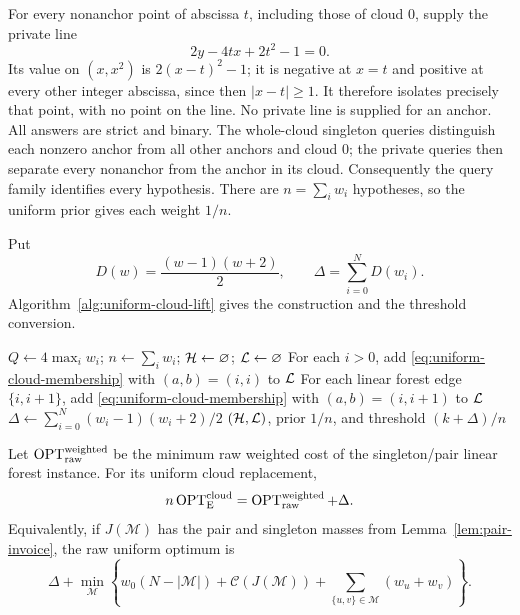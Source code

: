 For every nonanchor point of abscissa $t$, including those of
cloud $0$, supply the private line
\[
 2y-4tx+2t^2-1=0.
\]
Its value on $(x,x^2)$ is $2(x-t)^2-1$; it is negative at $x=t$
and positive at every other integer abscissa, since then $|x-t|\ge1$.
It therefore isolates precisely that point, with no point on the line.
No private line is supplied for an anchor. All answers are strict
and binary. The whole-cloud singleton queries distinguish each
nonzero anchor from all other anchors and cloud $0$; the private
queries then separate every nonanchor from the anchor in its cloud.
Consequently the query family identifies every hypothesis. There are
$n=\sum_iw_i$ hypotheses, so the uniform prior gives each weight $1/n$.

Put
\begin{equation}\label{eq:uniform-cloud-offset}
 D(w)=\frac{(w-1)(w+2)}2,\qquad
 \Delta=\sum_{i=0}^N D(w_i).
\end{equation}
Algorithm~\ref{alg:uniform-cloud-lift} gives the construction and
the threshold conversion.

\begin{algorithm}[H]
\caption{Uniform cloud replacement of a weighted linear forest instance}
\label{alg:uniform-cloud-lift}
$Q\gets4\max_i w_i$; $n\gets\sum_iw_i$;
$\mathcal H\gets\varnothing$; $\mathcal L\gets\varnothing$\;
For each $i>0$, add \eqref{eq:uniform-cloud-membership}
with $(a,b)=(i,i)$ to $\mathcal L$\;
For each linear forest edge $\{i,i+1\}$, add
\eqref{eq:uniform-cloud-membership} with $(a,b)=(i,i+1)$ to $\mathcal L$\;
$\Delta\gets\sum_{i=0}^N(w_i-1)(w_i+2)/2$\;
\KwRet $(\mathcal H,\mathcal L)$, prior $1/n$, and threshold $(k+\Delta)/n$\;
\end{algorithm}

\begin{theorem}\label{thm:uniform-cloud-transfer}
Let $\operatorname{OPT}_{\mathrm{raw}}^{\mathrm{weighted}}$ be the minimum
raw weighted cost of the singleton/pair linear forest instance.
For its uniform cloud replacement,
\begin{equation}\label{eq:uniform-cloud-transfer}
 n\operatorname{OPT}_{\mathrm E}^{\mathrm{cloud}}
   =\operatorname{OPT}_{\mathrm{raw}}^{\mathrm{weighted}}+\Delta.
\end{equation}
Equivalently, if $J(\mathcal M)$ has the pair and singleton masses
from Lemma~\ref{lem:pair-invoice}, the raw uniform optimum is
\[
 \Delta+\min_{\mathcal M}
 \left\{w_0(N-|\mathcal M|)
   +\mathcal C(J(\mathcal M))
   +\sum_{\{u,v\}\in\mathcal M}(w_u+w_v)\right\}.
\]
\end{theorem}

